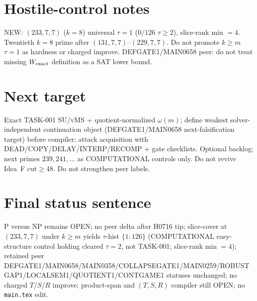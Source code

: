 \documentclass[11pt]{article}
\begin{document}
\section*{Hostile-control notes}
NEW: $(233,7,7)$ ($k{=}8$) universal $\tau{=}1$ ($0/126$ $\tau{\ge}2$), slice-rank min $=4$.
Twentieth $k{=}8$ prime after $(131,7,7)$--$(229,7,7)$.
Do not promote $k{\ge}m$ $\tau{=}1$ as hardness or charged improve.
DEFGATE1/MAIN0658 peer: do not treat missing $W_{\rm exact}$ definition as a SAT lower bound.

\section*{Next target}
Exact TASK-001 SU/vMS + quotient-normalized $\omega(m)$; define weakest solver-independent
continuation object (DEFGATE1/MAIN0658 next-falsification target) before compiler;
attack acquisition with DEAD/COPY/DELAY/INTERP/RECOMP + gate checklists.
Optional backlog: next primes $239,241,\ldots$ as COMPUTATIONAL controls only.
Do not revive Idea~F cut$\ge48$. Do not strengthen peer labels.

\section*{Final status sentence}
P versus NP remains OPEN; no peer delta after H0716 tip; slice-cover at $(233,7,7)$ under $k{\ge}m$ yields $\tau$-hist $\{1{:}126\}$ (COMPUTATIONAL easy-structure control holding cleared $\tau{=}2$, not TASK-001; slice-rank min $=4$); retained peer DEFGATE1/MAIN0658/MAIN0358/COLLAPSEGATE1/MAIN0259/ROBUSTGAP1/LOCALSEM1/QUOTIENT1/CONTGAME1 statuses unchanged; no charged $T$/$S$/$R$ improve; product-span and $(T,S,R)$ compiler still OPEN; no \texttt{main.tex} edit.
\end{document}
